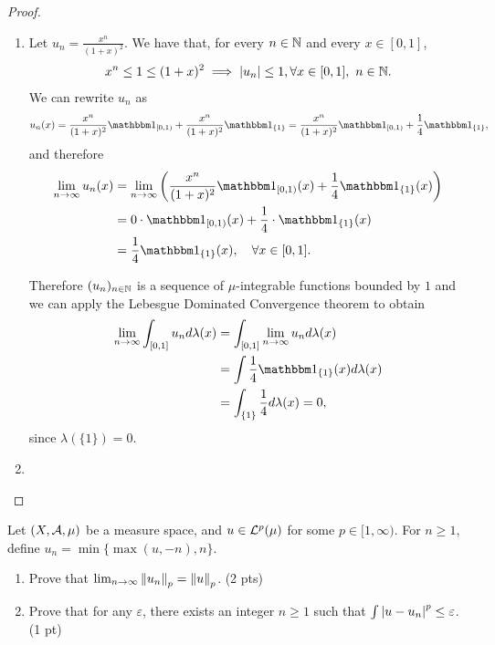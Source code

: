 \begin{proof}$ $\newline
	\begin{enumerate}
		\item Let $u_n = \frac{x^n}{(1+ x)^2}$. We have that, for every $n \in \mathbb{N}$ and every $x \in [0,1]$,
		\begin{align*}
		x^n \leq 1 \leq (1 + x)^2 \implies \left\vert{u_n}\right\vert \leq 1, \forall x \in [0,1],\ n \in \mathbb{N}.
		\end{align*}
		We can rewrite $u_n$ as
		\begin{align*}
		u_n(x) = \frac{x^n}{(1+ x)^2}\ind_{[0,1)} + \frac{x^n}{(1+ x)^2}\ind_{\{1\}} = \frac{x^n}{(1+ x)^2}\ind_{[0,1)} + \frac{1}{4}\ind_{\{1\}},
		\end{align*}
		and therefore
		\begin{align*}
		\lim_{n\to\infty} u_n(x)
		&= \lim_{n\to\infty}\left( \frac{x^n}{(1+ x)^2}\ind_{[0,1)}(x) + \frac{1}{4}\ind_{\{1\}}(x) \right) \\
		&= 0\cdot\ind_{[0,1)}(x) + \frac{1}{4}\cdot\ind_{\{1\}}(x) \\
		&= \frac{1}{4}\ind_{\{1\}}(x),\quad \forall x \in [0,1].
		\end{align*}
		
		Therefore $(u_n)_{n\in\mathbb{N}}$ is a sequence of $\mu$-integrable functions bounded by $1$ and we can apply the Lebesgue Dominated Convergence theorem to obtain
		\begin{align*}
		\lim_{n\to\infty} \int_{[0,1]} u_n d\lambda(x)
		&= \int_{[0,1]} \lim_{n \to \infty} u_n d\lambda(x)\\
		&= \int \frac{1}{4}\ind_{\{1\}}(x) d\lambda(x)\\
		&= \int_{\{1\}} \frac{1}{4}d\lambda(x)
		= 0,
		\end{align*}
		since $\lambda(\{1\}) = 0$.
		
		\item
	\end{enumerate}
\end{proof}

\begin{ex}
	Let $(X, \mathcal{A}, \mu)$ be a measure space, and $u \in \mathcal{L}^p(\mu)$ for some $p \in [1, \infty)$. For $n \geq 1$, define $u_n = \min\{ \max(u, -n), n \}$.
	
	\begin{enumerate}
		\item Prove that $\lim_{n\to\infty} \left\Vert{u_n}\right\Vert_p = \left\Vert{u}\right\Vert_p$. (2 pts)
		\item Prove that for any $\varepsilon$, there exists an integer $n \geq 1$ such that $\int \left\vert{u - u_n}\right\vert^p \leq \varepsilon$. (1 pt)
	\end{enumerate}
\end{ex}


